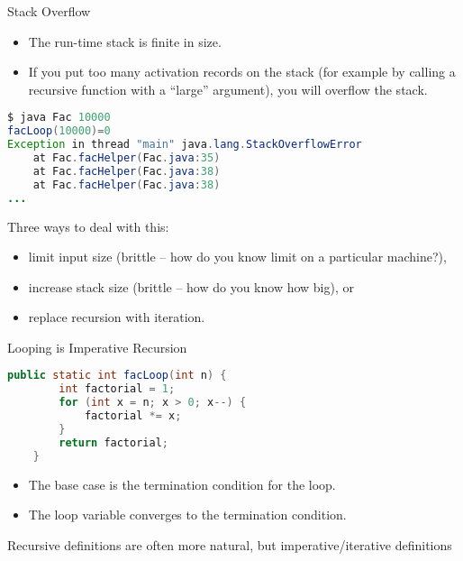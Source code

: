 \documentclass{beamer}
\begin{document}
\begin{frame}[fragile]{Stack Overflow}



\begin{itemize}
\item The run-time stack is finite in size.
\item If you put too many activation records on the stack (for example by calling a recursive function with a ``large'' argument), you will overflow the stack.
\end{itemize}

\begin{lstlisting}[language=Java]
$ java Fac 10000
facLoop(10000)=0
Exception in thread "main" java.lang.StackOverflowError
	at Fac.facHelper(Fac.java:35)
	at Fac.facHelper(Fac.java:38)
	at Fac.facHelper(Fac.java:38)
...
\end{lstlisting}

Three ways to deal with this:

\begin{itemize}
\item limit input size (brittle -- how do you know limit on a particular machine?),
\item increase stack size (brittle -- how do you know how big), or 
\item replace recursion with iteration.
\end{itemize}

\end{frame}

\begin{frame}[fragile]{Looping is Imperative Recursion}


\begin{lstlisting}[language=Java]
    public static int facLoop(int n) {
        int factorial = 1;
        for (int x = n; x > 0; x--) {
            factorial *= x;
        }
        return factorial;
    }
\end{lstlisting}

\begin{itemize}
\item The base case is the termination condition for the loop.
\item The loop variable converges to the termination condition.
\end{itemize}

Recursive definitions are often more natural, but imperative/iterative definitions

\end{frame}
\end{document}
